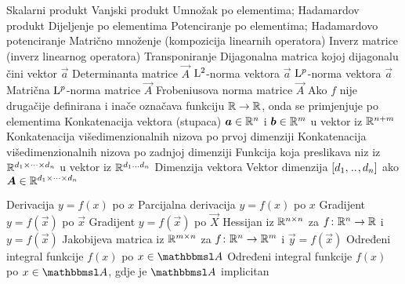  {} 
	{Skalarni produkt}
	{Vanjski produkt}
	{Umnožak po elementima; Hadamardov produkt}
	{Dijeljenje po elementima}
	{Potenciranje po elementima; Hadamardovo potenciranje}
	{Matrično množenje (kompozicija linearnih operatora)}
	{Inverz matrice (inverz linearnog operatora)}
	{Transponiranje}
	{Dijagonalna matrica kojoj dijagonalu čini vektor $\vec a$}
	{Determinanta matrice $\vec A$}
	{$\mathrm{L}^2$-norma vektora $\vec a$}
	{$\mathrm{L}^p$-norma vektora $\vec a$}
	{Matrična $\mathrm{L}^p$-norma matrice $\vec A$}
	{Frobeniusova norma matrice $\vec A$}
	{Ako $f$ nije drugačije definirana i inače označava funkciju $\mathbb{R}\to\mathbb{R}$, onda se primjenjuje po elementima}
	{Konkatenacija vektora (stupaca) $\vec a\in\R^n$ i $\vec b\in\R^m$ u vektor iz $\mathbb{R}^{n+m}$}
	{Konkatenacija višedimenzionalnih nizova po prvoj dimenziji}
	{Konkatenacija višedimenzionalnih nizova po zadnjoj dimenziji}
	{Funkcija koja preslikava niz iz $\mathbb{R}^{d_1\times\dots\times d_n}$ u vektor iz $\mathbb{R}^{d_1\dots d_n}$}
	{Dimenzija vektora}
	{Vektor dimenzija $\sbr{d_1,\bidot,d_n}$ ako $\vec A\in\R^{d_1\times\dots\times d_n}$}

	{Derivacija $y=f(x)$ po $x$}
	{Parcijalna derivacija $y=f(x)$ po $x$}
	{Gradijent $y=f(\vec x)$ po $\vec x$}
	{Gradijent $y=f(\vec x)$ po $\vec X$}
	{Hessijan iz $\mathbb{R}^{n\times n}$ za $f \colon \mathbb{R}^n \to \mathbb{R}$ i $y=f(\vec x)$}
	{Jakobijeva matrica iz $\mathbb{R}^{m\times n}$ za $f \colon \mathbb{R}^n \to \mathbb{R}^m$ i $\vec y=f(\vec x)$}
	{Određeni integral funkcije $f(x)$ po $x\in\set A$}
	{Određeni integral funkcije $f(x)$ po $x\in\set A$, gdje je $\set A$ implicitan}

